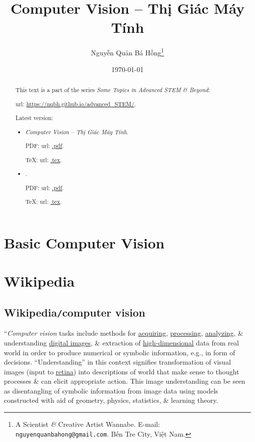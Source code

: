 \documentclass{article}
\title{Computer Vision -- Thị Giác Máy Tính}
\author{Nguyễn Quản Bá Hồng\footnote{A Scientist {\it\&} Creative Artist Wannabe. E-mail: {\tt nguyenquanbahong@gmail.com}. Bến Tre City, Việt Nam.}}
\date{\today}
\begin{document}
\maketitle
\begin{abstract}
	This text is a part of the series {\it Some Topics in Advanced STEM \& Beyond}:
	
	{\sc url}: \url{https://nqbh.github.io/advanced_STEM/}.
	
	Latest version:
	\begin{itemize}
		\item {\it Computer Vision -- Thị Giác Máy Tính}.
		
		PDF: {\sc url}: \url{.pdf}.
		
		\TeX: {\sc url}: \url{.tex}.
		\item {\it }.
		
		PDF: {\sc url}: \url{.pdf}.
		
		\TeX: {\sc url}: \url{.tex}.
	\end{itemize}
\end{abstract}
\tableofcontents


\section{Basic Computer Vision}


\section{Wikipedia}

\subsection{Wikipedia{\tt/}computer vision}
``{\it Computer vision} tasks include methods for \href{https://en.wikipedia.org/wiki/Image_sensor}{acquiring}, \href{https://en.wikipedia.org/wiki/Image_processing}{processing}, \href{https://en.wikipedia.org/wiki/Image_analysis}{analyzing}, \& understanding \href{https://en.wikipedia.org/wiki/Digital_image}{digital images}, \& extraction of \href{https://en.wikipedia.org/wiki/High-dimensional}{high-dimensional} data from real world in order to produce numerical or symbolic information, e.g., in form of decisions. ``Understanding'' in this context signifies transformation of visual images (input to \href{https://en.wikipedia.org/wiki/Retina}{retina}) into descriptions of world that make sense to thought processes \& can elicit appropriate action. This image understanding can be seen as disentangling of symbolic information from image data using models constructed with aid of geometry, physics, statistics, \& learning theory.
\end{document}
